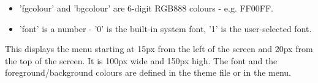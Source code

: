   \begin{itemize}
    \item 'fgcolour' and 'bgcolour' are 6-digit RGB888 colours - e.g. FF00FF.
    \item 'font' is a number - '0' is the built-in system font, '1' is the
    user-selected font.
  \end{itemize}

\begin{example}
\end{example}
This displays the menu starting at 15px from the left of the screen and 20px
from the top of the screen.  It is 100px wide and 150px high.
The font and the foreground/background colours are defined in the theme
 file or in the  menu.
